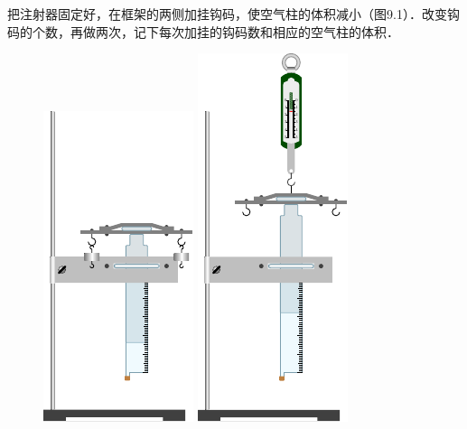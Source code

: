 把注射器固定好，在框架的两侧加挂钩码，使空气柱的体积减小（图9.1）．改变钩码的个数，再做两次，记下每次加挂的钩码数和相应的空气柱的体积．
\begin{figure}[htbp]
    \centering
    \begin{minipage}[t]{0.48\textwidth}
        \centering
        \includegraphics{fig/B/9-1.pdf}
        \caption{}\label{fig_B_9-1}
    \end{minipage}
    \begin{minipage}[t]{0.48\textwidth}
        \centering
        \includegraphics{fig/B/9-2.pdf}
        \caption{}\label{fig_B_9-2}
    \end{minipage}
\end{figure}

